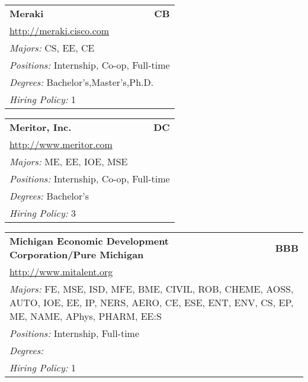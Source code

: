 \documentclass[twoside]{article}
\begin{document}
\begin{center}
\begin{multicols}{3}
\begin{FlushLeft}
\begin{minipage}{\columnwidth}\begin{tabularx}{.95\columnwidth}{Xr}
                 {\Large\bf Meraki} & {\Large\bf CB}\\
    \multicolumn{2}{p{.95\columnwidth}}{\url{http://meraki.cisco.com}}\\
    \multicolumn{2}{p{.95\columnwidth}}{\emph{Majors:} CS, EE, CE}\\
    \multicolumn{2}{p{.95\columnwidth}}{\emph{Positions:} Internship, Co-op, Full-time}\\
    \multicolumn{2}{p{.95\columnwidth}}{\emph{Degrees:} Bachelor's,Master's,Ph.D.}\\
    \multicolumn{2}{p{.95\columnwidth}}{\emph{Hiring Policy:} 1}\\
    \end{tabularx}
    
\end{minipage}
 
\begin{minipage}{\columnwidth}\begin{tabularx}{.95\columnwidth}{Xr}
                 {\Large\bf Meritor, Inc.} & {\Large\bf DC}\\
    \multicolumn{2}{p{.95\columnwidth}}{\url{http://www.meritor.com}}\\
    \multicolumn{2}{p{.95\columnwidth}}{\emph{Majors:} ME, EE, IOE, MSE}\\
    \multicolumn{2}{p{.95\columnwidth}}{\emph{Positions:} Internship, Co-op, Full-time}\\
    \multicolumn{2}{p{.95\columnwidth}}{\emph{Degrees:} Bachelor's}\\
    \multicolumn{2}{p{.95\columnwidth}}{\emph{Hiring Policy:} 3}\\
    \end{tabularx}
    
\end{minipage}
 
\begin{minipage}{\columnwidth}\begin{tabularx}{.95\columnwidth}{Xr}
                 {\Large\bf Michigan Economic Development Corporation/Pure Michigan} & {\Large\bf BBB}\\
    \multicolumn{2}{p{.95\columnwidth}}{\url{http://www.mitalent.org}}\\
    \multicolumn{2}{p{.95\columnwidth}}{\emph{Majors:} FE, MSE, ISD, MFE, BME, CIVIL, ROB, CHEME, AOSS, AUTO, IOE, EE, IP, NERS, AERO, CE, ESE, ENT, ENV, CS, EP, ME, NAME, APhys, PHARM, EE:S}\\
    \multicolumn{2}{p{.95\columnwidth}}{\emph{Positions:} Internship, Full-time}\\
    \multicolumn{2}{p{.95\columnwidth}}{\emph{Degrees:} }\\
    \multicolumn{2}{p{.95\columnwidth}}{\emph{Hiring Policy:} 1}\\
    \end{tabularx}
    

\end{minipage}
\end{FlushLeft}
\end{multicols}
\end{center}
\end{document}

